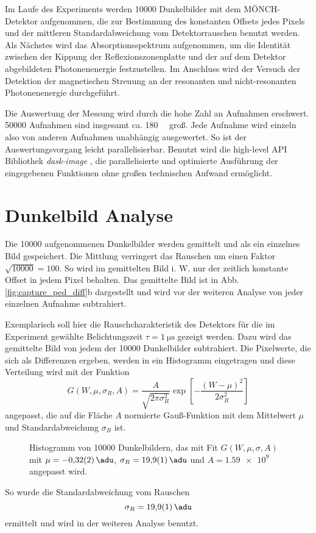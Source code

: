 \noindent
Im Laufe des Experiments werden \num{10000} Dunkelbilder mit dem MÖNCH-Detektor aufgenommen, die zur Bestimmung des konstanten Offsets jedes Pixels und der mittleren Standardabweichung vom Detektorrauschen benutzt werden. Als Nächstes wird das Absorptionsspektrum aufgenommen, um die Identität zwischen der Kippung der Reflexionszonenplatte und der auf dem Detektor abgebildeten Photonenenergie festzustellen. Im Anschluss wird der Versuch der Detektion der magnetischen Streuung an der resonanten und nicht-resonanten Photonenenergie durchgeführt.   

\noindent
Die Auswertung der Messung wird durch die hohe Zahl an Aufnahmen erschwert. \num{50000} Aufnahmen sind insgesamt ca. \qty{180}{\giga\byte} groß. Jede Aufnahme wird einzeln also von anderen Aufnahmen unabhängig ausgewertet. So ist der Auswertungsvorgang leicht parallelisierbar. Benutzt wird die high-level API Bibliothek \textit{dask-image} \cite{dask-library}, die parallelisierte und optimierte Ausführung der eingegebenen Funktionen ohne großen technischen Aufwand ermöglicht.

\section{Dunkelbild Analyse}
Die \num{10000} aufgenommenen Dunkelbilder werden gemittelt und als ein einzelnes Bild gespeichert. Die Mittlung verringert das Rauschen um einen Faktor $\sqrt{10000} = 100$. So wird im gemittelten Bild i. W. nur der zeitlich konstante Offset in jedem Pixel behalten. Das gemittelte Bild ist in Abb. \ref{fig:capture_ped_diff}b dargestellt und wird vor der weiteren Analyse von jeder einzelnen Aufnahme subtrahiert.

\noindent
Exemplarisch soll hier die Rauschcharakteristik des Detektors für die im Experiment gewählte Belichtungszeit $\tau = \SI{1}{\micro\second}$ gezeigt werden. Dazu wird das gemittelte Bild von jedem der \num{10000} Dunkelbilder subtrahiert. Die Pixelwerte, die sich als Differenzen ergeben, werden in ein Histogramm eingetragen und diese Verteilung wird mit der Funktion
\begin{equation}
    G(W, \mu, \sigma_R, A) = \frac{A}{\sqrt{2\pi \sigma_R^2}}\exp\left[-\frac{(W - \mu)^2}{2\sigma_R^2}\right]
    \label{eq:gauss_funktion}
\end{equation}
angepasst, die auf die Fläche $A$ normierte Gauß-Funktion mit dem Mittelwert $\mu$ und Standardabweichung $\sigma_R$ ist.
\begin{figure}[H]
    \centering
    
    \caption{Histogramm von \num{10000} Dunkelbildern, das mit Fit $G(W,\mu,\sigma, A)$ mit $\mu= \SI{-0.32(2)}{\adu}$, $\sigma_R = \SI{19.9(1)}{\adu}$ und $A = \num{1.59e9}$ angepasst wird.}
    \label{fig:noise_hist_fit}
\end{figure}
\noindent
So wurde die Standardabweichung vom Rauschen
\begin{equation}
    \sigma_R = \SI{19.9(1)}{\adu}
    \label{eq:sigma_r}
\end{equation}
ermittelt und wird in der weiteren Analyse benutzt.


